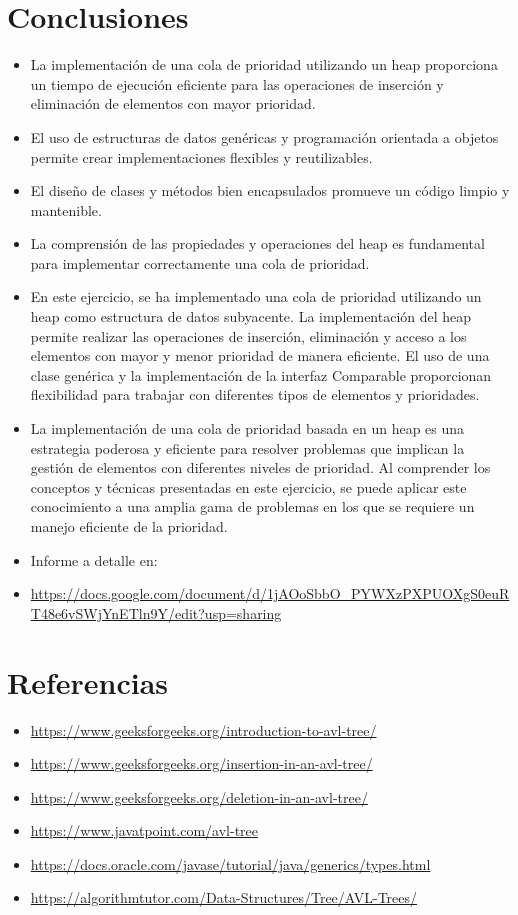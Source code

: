 \documentclass{article}
\begin{document}
	\section{Conclusiones}
	\begin{itemize}
		\item La implementación de una cola de prioridad utilizando un heap proporciona un tiempo de ejecución eficiente para las operaciones de inserción y eliminación de elementos con mayor prioridad.
		\item El uso de estructuras de datos genéricas y programación orientada a objetos permite crear implementaciones flexibles y reutilizables.
		\item El diseño de clases y métodos bien encapsulados promueve un código limpio y mantenible.
		\item La comprensión de las propiedades y operaciones del heap es fundamental para implementar correctamente una cola de prioridad.
		\item En este ejercicio, se ha implementado una cola de prioridad utilizando un heap como estructura de datos subyacente. La implementación del heap permite realizar las operaciones de inserción, eliminación y acceso a los elementos con mayor y menor prioridad de manera eficiente. El uso de una clase genérica y la implementación de la interfaz Comparable proporcionan flexibilidad para trabajar con diferentes tipos de elementos y prioridades.
		\item La implementación de una cola de prioridad basada en un heap es una estrategia poderosa y eficiente para resolver problemas que implican la gestión de elementos con diferentes niveles de prioridad. Al comprender los conceptos y técnicas presentadas en este ejercicio, se puede aplicar este conocimiento a una amplia gama de problemas en los que se requiere un manejo eficiente de la prioridad.
		\item Informe a detalle en: 
		\item \url {https://docs.google.com/document/d/1jAOoSbbO_PYWXzPXPUOXgS0euRT48e6vSWjYnETln9Y/edit?usp=sharing}

	\end{itemize}
	\section{Referencias}
	\begin{itemize}
		\item \url{https://www.geeksforgeeks.org/introduction-to-avl-tree/}
		\item \url{https://www.geeksforgeeks.org/insertion-in-an-avl-tree/}
		\item \url{https://www.geeksforgeeks.org/deletion-in-an-avl-tree/}
		\item \url{https://www.javatpoint.com/avl-tree}
		\item \url{https://docs.oracle.com/javase/tutorial/java/generics/types.html}
		\item \url{https://algorithmtutor.com/Data-Structures/Tree/AVL-Trees/}
	\end{itemize}	
	
\end{document}

